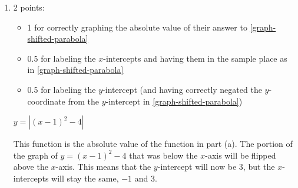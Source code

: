 \documentclass{article}
\begin{document}
\begin{enumerate}
\begin{enumerate}
    \begin{solution}
      Starting with the graph of $y=x^2$, we shift 1 unit to the right and 4 units down.
      
      To find the $y$-intercept, we set $x$ equal to zero and solve for $y$: $y=(0-1)^2-4=-3$. 
      To find the $x$-intercepts, we set $y$ equal to zero and solve for $x$:
      \begin{align*}
          0 &= (x-1)^2-4 \\
          &= x^2 - 2x -3 \\
          &= (x-3)(x+1) \\
          &\therefore\, x=-1,\,3.
      \end{align*}
      

    \end{solution}

  \item

    \begin{grading}
      2 points:
      \begin{itemize}[nosep]
      \item 1 for correctly graphing the absolute value of their answer to \ref{graph-shifted-parabola}
      \item 0.5 for labeling the $x$-intercepts and having them in the sample place as in \ref{graph-shifted-parabola}
      \item 0.5 for labeling the $y$-intercept (and having correctly negated the $y$-coordinate from the $y$-intercept in \ref{graph-shifted-parabola})
      \end{itemize}
    \end{grading}

    \begin{problem}[\vfill]
      $y = \left| (x - 1)^2 - 4 \right|$
    \end{problem}

    \begin{solution}
      This function is the absolute value of the function in part (a). The portion of the
      graph of $y=(x-1)^2-4$ that was below the $x$-axis will be flipped above the $x$-axis. This
      means that the $y$-intercept will now be $3$, but the $x$-intercepts will stay the same,
      $-1$ and $3$.


\end{solution}
\end{enumerate}
\end{enumerate}
\end{document}
